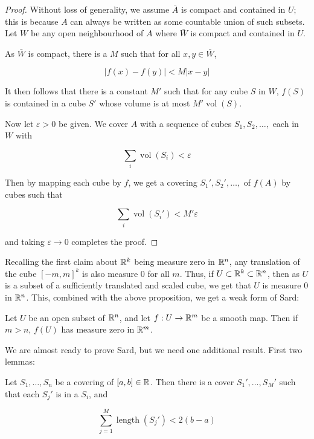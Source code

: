 \begin{proof}
    Without loss of generality, we assume $\bar{A}$ is compact and contained in $U$; this is because $A$ can always be written as some countable union of such subsets. Let $W$ be any open neighbourhood of $A$ where $\bar{W}$ is compact and contained in $U$. 

    As $\bar{W}$ is compact, there is a $M$ such that for  all $x,y \in \bar{W}$,

    \[|f(x) - f(y)| < M|x-y|\]

    It then follows that there is a constant $M'$ such that for any cube $S$ in $W$, $f(S)$ is contained in a cube $S'$ whose volume is at most $M'\operatorname{vol}(S)$. 

    Now let $\varepsilon > 0$ be given. We cover $A$ with a sequence of cubes $S_1, S_2, \ldots,$ each in $W$ with 

    \[\sum_i \operatorname{vol}(S_i) < \varepsilon\]

    Then by mapping each cube by $f$, we get a covering $S_1', S_2', \ldots,$ of $f(A)$ by cubes such that 

    \[\sum_i \operatorname{vol}(S_i') < M'\varepsilon\]

    and taking $\varepsilon \to 0$ completes the proof.
\end{proof}

Recalling the first claim about $\mathbb{R}^k$ being measure zero in $\mathbb{R}^n$, any translation of the cube $[-m,m]^k$ is also measure 0 for all $m$. Thus, if $U \subset \mathbb{R}^k \subset \mathbb{R}^n$, then as $U$ is a subset of a sufficiently translated and scaled cube, we get that $U$ is measure 0 in $\mathbb{R}^n$. This, combined with the above proposition, we get a weak form of Sard:

\begin{theorem}
    Let $U$ be an open subset of $\mathbb{R}^n$, and let $f: U \to \mathbb{R}^m$ be a smooth map. Then if $m > n$, $f(U)$ has measure zero in $\mathbb{R}^m$. 
\end{theorem}

We are almost ready to prove Sard, but we need one additional result. First two lemmas:

\begin{lemma}
    Let $S_1, \ldots, S_n$ be a covering of $[a,b] \in \mathbb{R}$. Then there is a cover $S_1', \ldots, S_M'$ such that each $S_j'$ is in a $S_i$, and 

    \[\sum_{j=1}^M \operatorname{length}(S_j') < 2(b-a)\]
\end{lemma}

